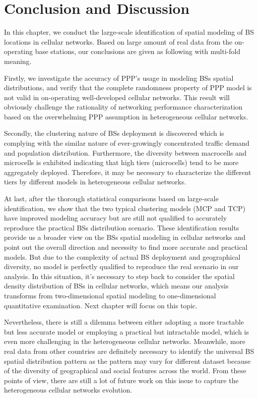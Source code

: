 \section{Conclusion and Discussion} \label{sec3-6}
In this chapter, we conduct the large-scale identification of spatial modeling of BS locations in cellular networks. Based on large amount of real data from the on-operating base stations, our conclusions are given as following with multi-fold meaning.

Firstly, we investigate the accuracy of PPP's usage in modeling BSs spatial distributions, and verify that the complete randomness property of PPP model is not valid in on-operating well-developed cellular networks. This result will obviously challenge the rationality of networking performance characterization based on the overwhelming PPP assumption in heterogeneous cellular networks.

Secondly, the clustering nature of BSs deployment is discovered which is complying with the similar nature of ever-growingly concentrated traffic demand and population distribution. Furthermore, the diversity between macrocells and microcells is exhibited indicating that high tiers (microcells) tend to be more aggregately deployed. Therefore, it may be necessary to characterize the different tiers by different models in heterogeneous cellular networks.

At last, after the thorough statistical comparisons based on large-scale identification, we show that the two typical clustering models (MCP and TCP) have improved modeling accuracy but are still not qualified to accurately reproduce the practical BSs distribution scenario. These identification results provide us a broader view on the BSs spatial modeling in cellular networks and point out the overall direction and necessity to find more accurate and practical models. But due to the complexity of actual BS deployment and geographical diversity, no model is perfectly qualified to reproduce the real scenario in our analysis. In this situation, it's necessary to step back to consider the spatial density distribution of BSs in cellular networks, which means our analysis transforms from two-dimensional spatial modeling to one-dimensional quantitative examination. Next chapter will focus on this topic.

Nevertheless, there is still a dilemma between either adopting a more tractable but less accurate model or employing a practical but intractable model, which is even more challenging in the heterogeneous cellular networks. Meanwhile, more real data from other countries are definitely necessary to identify the universal BS spatial distribution pattern as the pattern may vary for different dataset because of the diversity of geographical and social features across the world. From these points of view, there are still a lot of future work on this issue to capture the heterogeneous cellular networks evolution.
